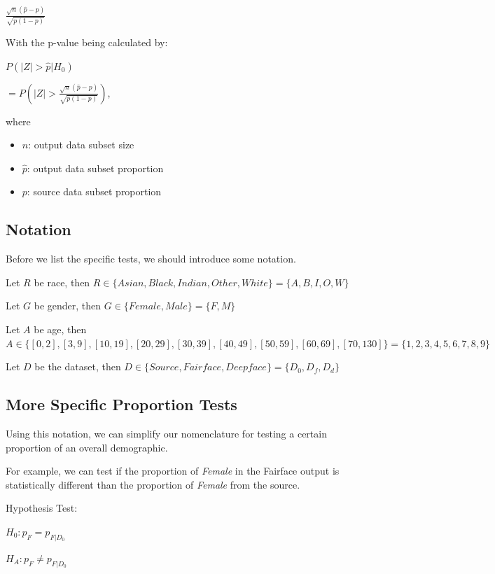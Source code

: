 \documentclass[
  letterpaper,
  DIV=11,
  numbers=noendperiod]{scrreprt}
\providecommand{\tightlist}{%
  \setlength{\itemsep}{0pt}\setlength{\parskip}{0pt}}\usepackage{longtable,booktabs,array}
\begin{document}
\(\frac{\sqrt{n}(\hat{p} - p)}{\sqrt{p(1 - p)}}\)

With the p-value being calculated by:

\(P(|Z| > \hat{p} | H_0)\)

\(= P(|Z| > \frac{\sqrt{n}(\hat{p} - p)}{\sqrt{p(1 - p)}})\),

where

\begin{itemize}
\tightlist
\item
  \(n\): output data subset size
\item
  \(\hat{p}\): output data subset proportion
\item
  \(p\): source data subset proportion
\end{itemize}

\hypertarget{notation}{%
\subsection{Notation}\label{notation}}

Before we list the specific tests, we should introduce some notation.

Let \(R\) be race, then
\(R \in \{Asian, Black, Indian, Other, White\} = \{A, B, I, O, W\}\)

Let \(G\) be gender, then \(G \in \{Female, Male\} = \{F, M\}\)

Let \(A\) be age, then
\(A \in \{[0,2], [3,9], [10,19], [20,29], [30,39], [40,49], [50,59], [60,69], [70,130]\} = \{1, 2, 3, 4, 5, 6, 7, 8, 9\}\)

Let \(D\) be the dataset, then
\(D \in \{Source, Fairface, Deepface\} = \{D_0, D_f, D_d\}\)

\hypertarget{more-specific-proportion-tests}{%
\subsection{More Specific Proportion
Tests}\label{more-specific-proportion-tests}}

Using this notation, we can simplify our nomenclature for testing a
certain proportion of an overall demographic.

For example, we can test if the proportion of \emph{Female} in the
Fairface output is statistically different than the proportion of
\emph{Female} from the source.

Hypothesis Test:

\(H_0: p_F = p_{F|D_0}\)

\(H_A: p_F \neq p_{F|D_0}\)
\end{document}
